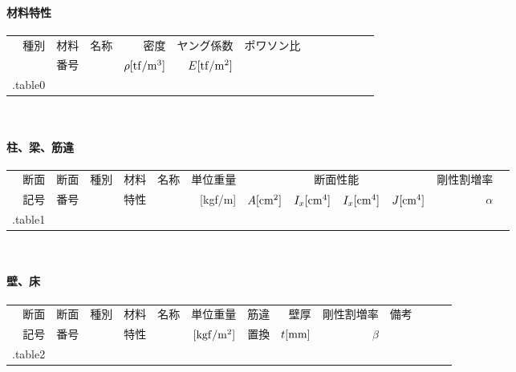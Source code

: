 \paragraph{材料特性}
{\footnotesize
\begin{tabular}{r r r r r r r r r r r r} \toprule
    種別 & 材料 & 名称 & 密度 & ヤング係数 & ポワソン比 \\
         & 番号 &      & $\rho{\rm [tf/m^3]}$ & $E {\rm [tf/m^2]}$ & \\ \midrule
{{.table0}}
\end{tabular}\\}

\paragraph{柱、梁、筋違}
{\footnotesize
\begin{tabular}{r r r r r r r r r r r r} \toprule
    断面 & 断面 & 種別 & 材料 & 名称 & 単位重量 & \multicolumn{4}{c}{断面性能} & 剛性割増率 \\
    記号 & 番号 &      & 特性 & & [kgf/m] & $A{\rm [cm^2]}$ & $I_x {\rm [cm^4]}$ & $I_x {\rm [cm^4]}$ & $J {\rm [cm^4]}$ & $\alpha$ \\ \midrule
{{.table1}}
\end{tabular}\\}

\paragraph{壁、床}
{\footnotesize
\begin{tabular}{r r r r r r r r r r r r r} \toprule
    断面 & 断面 & 種別 & 材料 & 名称 & 単位重量 & 筋違 & 壁厚 & 剛性割増率 & 備考\\
    記号 & 番号 &      & 特性 &    & ${\rm [kgf/m^2]}$ & 置換 & $t{\rm [mm]}$ & $\beta$ & \\ \midrule
{{.table2}}
\end{tabular}\\
}
\newpage
